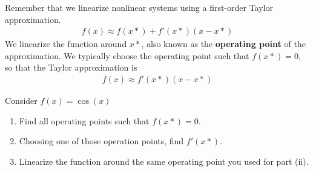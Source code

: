 

Remember that we linearize nonlinear systems using a first-order Taylor approximation.
\begin{align}
f(x) \approx f(x*) + f'(x*)(x - x*)
\end{align}
We linearize the function around $x*$, also known as the \textbf{operating point} of the approximation.
We typically choose the operating point such that $f(x*) = 0$, so that the Taylor approximation is
\begin{align}
f(x) \approx f'(x*)(x - x*)
\end{align}

\begin{enumerate}
    \qitem Consider $f(x) = \cos(x)$
    \begin{enumerate}[label = (\roman*)]
        \item Find all operating points such that $f(x*) = 0$.

        \item Choosing one of those operation points, find $f'(x*)$.

        \item Linearize the function around the same operating point you used for part (ii).
    \end{enumerate}


\end{enumerate}
